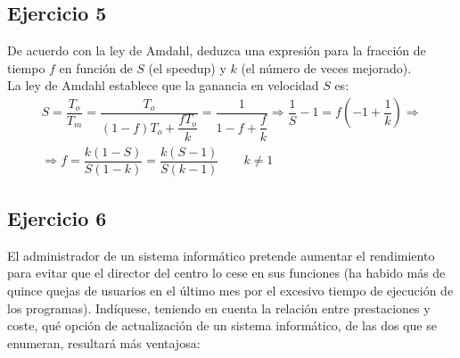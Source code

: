 \subsection*{Ejercicio 5}

De acuerdo con la ley de Amdahl, deduzca una expresión para la fracción de tiempo $f$ en función de $S$ (el speedup) y $k$ (el número de veces mejorado).\\

La ley de Amdahl establece que la ganancia en velocidad $S$ es:
\begin{multline*}
    S = \dfrac{T_o}{T_m} = \dfrac{T_o}{(1-f)T_o + \dfrac{fT_o}{k}} = \dfrac{1}{1-f + \dfrac{f}{k}}
    \Longrightarrow \dfrac{1}{S}-1=f\left(-1+\dfrac{1}{k}\right)
    \Longrightarrow \\ \Longrightarrow
    f = \dfrac{k(1-S)}{S(1-k)} = \dfrac{k(S-1)}{S(k-1)}\qquad k\neq 1
\end{multline*}

\subsection*{Ejercicio 6}

El administrador de un sistema informático pretende aumentar el rendimiento para evitar que el director del centro lo cese en sus funciones (ha habido más de quince quejas de usuarios en el último mes por el excesivo tiempo de ejecución de los programas). Indíquese, teniendo en cuenta la relación entre prestaciones y coste, qué opción de actualización de un sistema informático, de las dos que se enumeran, resultará más ventajosa:

